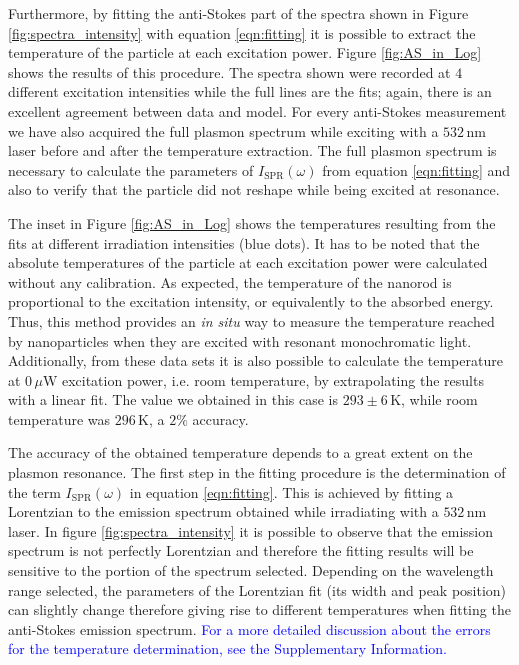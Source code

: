 \documentclass[journal=nalefd,manuscript=letter]{achemso}
\newcommand{\HI}[1]{\textcolor{blue}{#1}} %
\newcommand{\K}{\ensuremath{\,\textrm{K}}}
\newcommand{\nm}{\ensuremath{\,\textrm{nm}}}
\newcommand{\uW}{\ensuremath{\,\mu\textrm{W}}}
\begin{document}
Furthermore, by fitting the anti-Stokes part of the spectra shown in Figure
\ref{fig:spectra_intensity} with equation \ref{eqn:fitting} it is possible to extract
the temperature of the particle at each excitation power. Figure
\ref{fig:AS_in_Log} shows the results of this procedure. The spectra shown were
recorded at $4$ different excitation intensities while the full lines are the
fits; again, there is an excellent agreement between data and model. For every
anti-Stokes measurement we have also acquired the full plasmon spectrum while
exciting with a $532\nm$ laser before and after the temperature extraction.
The full plasmon spectrum is necessary to calculate the parameters of
$I_\textrm{SPR}(\omega)$ from equation \ref{eqn:fitting} and also to verify that the
particle did not reshape while being excited at resonance. 

The inset in Figure \ref{fig:AS_in_Log} shows the temperatures resulting from
the fits at different irradiation intensities (blue dots). It has to be noted
that the absolute temperatures of the particle at each excitation power were
calculated without any calibration. As expected, the temperature of the nanorod
is proportional to the excitation intensity, or equivalently to the absorbed
energy. Thus, this method provides an \textit{in situ} way to measure the
temperature reached by nanoparticles when they are excited with resonant
monochromatic light. Additionally, from these data sets it  is also possible to
calculate the temperature at $0\uW$ excitation power, i.e. room temperature, by
extrapolating the results with a linear fit. The value we obtained in this case
is $293\pm 6 \K$, while room temperature was $296\K$, a $2\%$ accuracy.

The accuracy of the obtained temperature depends to a great extent on the
plasmon resonance. The first step in the fitting procedure is the determination
of the term $I_\textrm{SPR}(\omega)$ in equation \ref{eqn:fitting}. This is achieved by
fitting a Lorentzian to the emission spectrum obtained while irradiating with a
$532\nm$ laser. In figure \ref{fig:spectra_intensity} it is possible to observe
that the emission spectrum is not perfectly Lorentzian and therefore the fitting
results will be sensitive to the portion of the spectrum selected. Depending on
the wavelength range selected, the parameters of the Lorentzian fit (its width
and peak position) can slightly change therefore giving rise to different
temperatures when fitting the anti-Stokes emission spectrum. \HI{For a more detailed 
discussion about the errors for the temperature determination, see the Supplementary Information.} 
\end{document}
